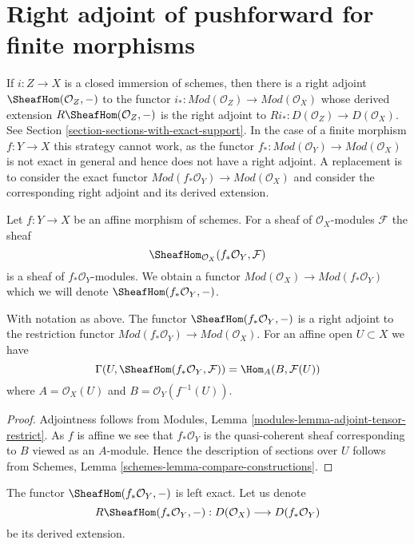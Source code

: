\section{Right adjoint of pushforward for finite morphisms}
\label{section-duality-finite}

\noindent
If $i : Z \to X$ is a closed immersion of schemes, then there is
a right adjoint $\SheafHom(\mathcal{O}_Z, -)$ to the functor
$i_* : \textit{Mod}(\mathcal{O}_Z) \to \textit{Mod}(\mathcal{O}_X)$
whose derived extension $R\SheafHom(\mathcal{O}_Z, -)$
is the right adjoint to $Ri_* : D(\mathcal{O}_Z) \to D(\mathcal{O}_X)$. See
Section \ref{section-sections-with-exact-support}.
In the case of a finite morphism $f : Y \to X$ this strategy
cannot work, as the functor
$f_* : \textit{Mod}(\mathcal{O}_Y) \to \textit{Mod}(\mathcal{O}_X)$
is not exact in general and hence does not have a right adjoint.
A replacement is to consider the exact functor
$\textit{Mod}(f_*\mathcal{O}_Y) \to \textit{Mod}(\mathcal{O}_X)$
and consider the corresponding right adjoint and its derived
extension.

\medskip\noindent
Let $f : Y \to X$ be an affine morphism of schemes. For a sheaf
of $\mathcal{O}_X$-modules $\mathcal{F}$ the sheaf
$$
\SheafHom_{\mathcal{O}_X}(f_*\mathcal{O}_Y, \mathcal{F})
$$
is a sheaf of $f_*\mathcal{O}_Y$-modules. We obtain a functor
$\textit{Mod}(\mathcal{O}_X) \to \textit{Mod}(f_*\mathcal{O}_Y)$
which we will denote $\SheafHom(f_*\mathcal{O}_Y, -)$.

\begin{lemma}
\label{lemma-compute-sheafhom-affine}
With notation as above. The functor $\SheafHom(f_*\mathcal{O}_Y, -)$ is a
right adjoint to the restriction functor
$\textit{Mod}(f_*\mathcal{O}_Y) \to \textit{Mod}(\mathcal{O}_X)$.
For an affine open $U \subset X$ we have
$$
\Gamma(U, \SheafHom(f_*\mathcal{O}_Y, \mathcal{F})) =
\Hom_A(B, \mathcal{F}(U))
$$
where $A = \mathcal{O}_X(U)$ and $B = \mathcal{O}_Y(f^{-1}(U))$.
\end{lemma}

\begin{proof}
Adjointness follows from
Modules, Lemma \ref{modules-lemma-adjoint-tensor-restrict}.
As $f$ is affine we see that $f_*\mathcal{O}_Y$ is
the quasi-coherent sheaf corresponding to $B$ viewed
as an $A$-module. Hence the description of sections over $U$ follows from
Schemes, Lemma \ref{schemes-lemma-compare-constructions}.
\end{proof}

\noindent
The functor $\SheafHom(f_*\mathcal{O}_Y, -)$ is left exact.
Let us denote
$$
R\SheafHom(f_*\mathcal{O}_Y, -) :
D(\mathcal{O}_X)
\longrightarrow
D(f_*\mathcal{O}_Y)
$$
be its derived extension.

